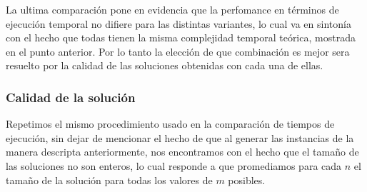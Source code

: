 La ultima comparación pone en evidencia que la perfomance en términos de ejecución temporal no difiere para las distintas variantes, lo cual va en sintonía con el hecho que todas tienen la misma complejidad temporal teórica, mostrada en el punto anterior. Por lo tanto la elección de que combinación es mejor sera resuelto por la calidad de las soluciones obtenidas con cada una de ellas.
\subsubsection{Calidad de la solución}

Repetimos el mismo procedimiento usado en la comparación de tiempos de ejecución, sin dejar de mencionar el hecho de que al generar las instancias de la manera descripta anteriormente, nos encontramos con el hecho que el tamaño de las soluciones no son enteros, lo cual responde a que promediamos para cada $n$ el tamaño de la solución para todas los valores de $m$ posibles.

